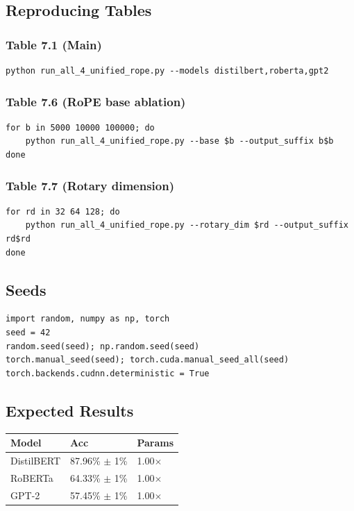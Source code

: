 \subsection{Reproducing Tables}

\subsubsection{Table 7.1 (Main)}

\begin{lstlisting}
python run_all_4_unified_rope.py --models distilbert,roberta,gpt2
\end{lstlisting}

\subsubsection{Table 7.6 (RoPE base ablation)}

\begin{lstlisting}
for b in 5000 10000 100000; do
    python run_all_4_unified_rope.py --base $b --output_suffix b$b
done
\end{lstlisting}

\subsubsection{Table 7.7 (Rotary dimension)}

\begin{lstlisting}
for rd in 32 64 128; do
    python run_all_4_unified_rope.py --rotary_dim $rd --output_suffix rd$rd
done
\end{lstlisting}

\subsection{Seeds}

\begin{lstlisting}
import random, numpy as np, torch
seed = 42
random.seed(seed); np.random.seed(seed)
torch.manual_seed(seed); torch.cuda.manual_seed_all(seed)
torch.backends.cudnn.deterministic = True
\end{lstlisting}

\subsection{Expected Results}

\begin{table}[H]
\centering
\small
\begin{tabular}{lll}
\toprule
\textbf{Model} & \textbf{Acc} & \textbf{Params} \\
\midrule
DistilBERT & 87.96\% $\pm$ 1\% & 1.00$\times$ \\
RoBERTa & 64.33\% $\pm$ 1\% & 1.00$\times$ \\
GPT-2 & 57.45\% $\pm$ 1\% & 1.00$\times$ \\
\bottomrule
\end{tabular}
\end{table}

